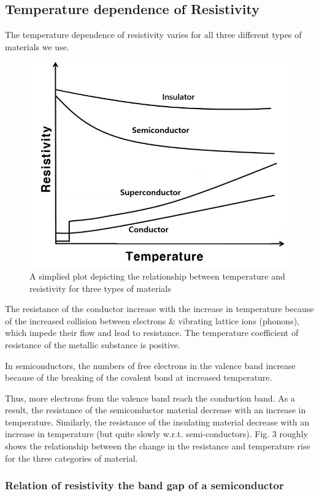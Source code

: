 \subsection{Temperature dependence of Resistivity}
The temperature dependence of resistivity varies for all three different types of materials we use.
\begin{figure}[H]
    \centering
    \includegraphics[width=.8\columnwidth]{images/t2.png}
    \caption{A simplied plot depicting the relationship between temperature and resistivity for three types of materials}
\end{figure}

The resistance of the conductor increase with the increase in temperature because of the increased collision between electrons \& vibrating lattice ions (phonons), which impede their flow and lead to resistance. The temperature coefficient of resistance of the metallic substance is positive.

In semiconductors, the numbers of free electrons in the valence band increase because of the breaking of the covalent bond at increased temperature. 

Thus, more electrons from the valence band reach the conduction band. As a result, the resistance of the semiconductor material decrease with an increase in temperature. 
Similarly, the resistance of the insulating material decrease with an increase in temperature (but quite slowly w.r.t. semi-conductors). Fig. 3 roughly shows the relationship between the change in the resistance and temperature rise for the three categories of material.

\subsubsection*{Relation of resistivity the band gap of a
semiconductor}

